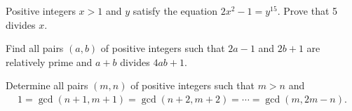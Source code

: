 \documentclass{subfile}
\begin{document}
	\begin{problem}
		Positive integers $x>1$ and $y$ satisfy the equation $2x^2-1=y^{15}$. Prove that 5 divides $x$. %
	\end{problem}


	\begin{problem}
		Find all pairs $(a,b)$ of positive integers such that $2a-1$ and $2b+1$ are relatively prime and $a+b$ divides $4ab+1.$ %
	\end{problem}




	\begin{problem}
		Determine all pairs $(m, n)$ of positive integers such that $m>n$ and
			\begin{align*}
				1 = \gcd(n+1,m+1) = \gcd(n+2,m+2) = \cdots = \gcd(m,2m-n).
			\end{align*}
	\end{problem}
\end{document}
